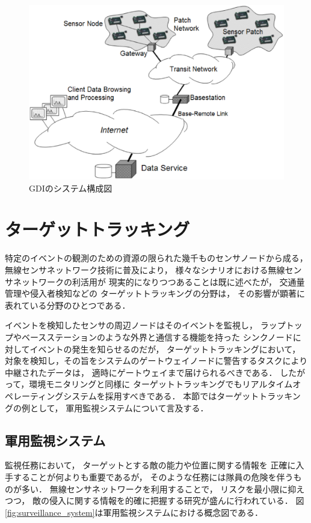 \begin{figure}[htbp]
 \begin{center}
  \includegraphics[width=120mm]{./images/gdi_system_architecture.eps}
 \end{center}
 \caption{GDIのシステム構成図}
 \label{fig:gdi_system_architecture}
\end{figure}




\section{ターゲットトラッキング}\label{sec:target_tracking}
特定のイベントの観測のための資源の限られた幾千ものセンサノードから成る，
無線センサネットワーク技術に普及により，
様々なシナリオにおける無線センサネットワークの利活用が
現実的になりつつあることは既に述べたが，
交通量管理や侵入者検知などの
ターゲットトラッキングの分野は，
その影響が顕著に表れている分野のひとつである．

イベントを検知したセンサの周辺ノードはそのイベントを監視し，
ラップトップやベースステーションのような外界と通信する機能を持った
シンクノードに対してイベントの発生を知らせるのだが，
ターゲットトラッキングにおいて，
対象を検知し，その旨をシステムのゲートウェイノードに警告するタスクにより
中継されたデータは，
適時にゲートウェイまで届けられるべきである．
したがって，環境モニタリングと同様に
ターゲットトラッキングでもリアルタイムオペレーティングシステムを採用すべきである．
本節ではターゲットトラッキングの例として，
軍用監視システムについて言及する．


\subsection{軍用監視システム}
監視任務において，
ターゲットとする敵の能力や位置に関する情報を
正確に入手することが何よりも重要であるが，
そのような任務には隊員の危険を伴うものが多い．
無線センサネットワークを利用することで，
リスクを最小限に抑えつつ，
敵の侵入に関する情報を的確に把握する研究が盛んに行われている．
図\ref{fig:surveillance_system}は軍用監視システムにおける概念図である．

